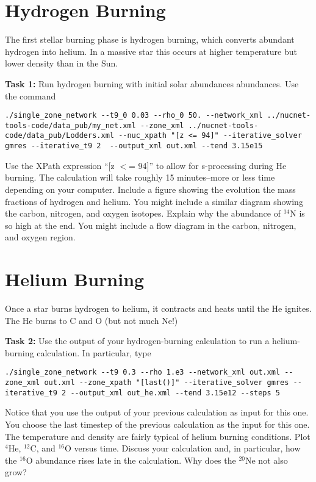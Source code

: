 \documentclass[manuscript]{aastex62}
\begin{document}
\section{Hydrogen Burning} \label{sec:H}

The first stellar burning phase is hydrogen burning, which converts
abundant hydrogen into helium.  In a massive star
this occurs at higher temperature but lower density than in the Sun.

{\bf Task 1:}
Run hydrogen burning with initial solar abundances abundances.  Use
the command
\begin{lstlisting}
./single_zone_network --t9_0 0.03 --rho_0 50. --network_xml ../nucnet-tools-code/data_pub/my_net.xml --zone_xml ../nucnet-tools-code/data_pub/Lodders.xml --nuc_xpath "[z <= 94]" --iterative_solver gmres --iterative_t9 2  --output_xml out.xml --tend 3.15e15
\end{lstlisting}
Use the XPath expression ``[z $<$= 94]'' to allow for s-processing
during He burning.  The
calculation will take roughly 15 minutes--more or less time depending on your
computer.  Include a figure showing the evolution the mass fractions
of hydrogen and helium.
You might include a similar diagram showing the carbon, nitrogen, and oxygen
isotopes.
Explain why the abundance of $^{14}$N is so high at the end.
You might include a flow diagram in the carbon, nitrogen, and oxygen region.

\section{Helium Burning} \label{sec:He}

Once a star burns hydrogen to helium, it contracts and heats until the He
ignites.  The He burns to C and O (but not much Ne!)

{\bf Task 2:}
Use the output of your hydrogen-burning calculation to run a helium-burning
calculation.  In particular, type
\begin{lstlisting}
./single_zone_network --t9 0.3 --rho 1.e3 --network_xml out.xml --zone_xml out.xml --zone_xpath "[last()]" --iterative_solver gmres --iterative_t9 2 --output_xml out_he.xml --tend 3.15e12 --steps 5
\end{lstlisting}
Notice that you use the output of your previous calculation as input
for this one.  You choose the last timestep of the previous calculation as
the input for this one.  The temperature and density are fairly typical of
helium burning conditions.
Plot $^4$He, $^{12}$C, and $^{16}$O versus time.
Discuss your calculation and, in particular, how the $^{16}$O
abundance rises late in the calculation.  Why does the $^{20}$Ne not also
grow?
\end{document}
